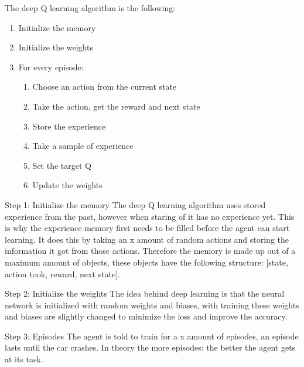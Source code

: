 \documentclass{article}
\begin{document}
The deep Q learning algorithm is the following:
\begin{enumerate}
\item Initialize the memory
\item Initialize the weights 
\item For every episode:
\begin{enumerate}
\item Choose an action from the current state
\item Take the action, get the reward and next state
\item Store the experience
\item Take a sample of experience
\item Set the target Q
\item Update the weights
\end{enumerate}
\end{enumerate}

\begin{flushleft}
Step 1: Initialize the memory
The deep Q learning algorithm uses stored experience from the past, however when staring of it has no experience yet. This is why the experience memory first needs to be filled before the agent can start learning. It does this by taking an x amount of random actions and storing the information it got from those actions. Therefore the memory is made up out of a maximum amount of objects, these objects have the following structure: 
[state, action took, reward, next state].
\end{flushleft}

\begin{flushleft}
Step 2: Initialize the weights
The idea behind deep learning is that the neural network is initialized with random weights and biases, with training these weights and biases are slightly changed to minimize the loss and improve the accuracy. 
\end{flushleft}

\begin{flushleft}
Step 3: Episodes
The agent is told to train for a x amount of episodes, an episode lasts until the car crashes. In theory the more episodes: the better the agent gets at its task.
\end{flushleft}
\end{document}

